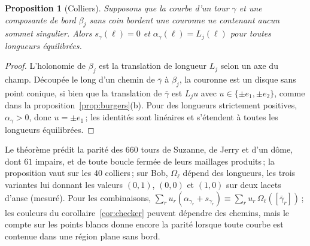 \documentclass[11pt,a4paper]{article}
\newtheorem{proposition}{Proposition}
\newcommand{\shift}{s}
\newcommand{\lean}[1]{\texttt{\detokenize{#1}}}
\newenvironment{evidence}[3][]{}{}
\begin{document}
\begin{evidence}{core}{\lean{collar}\,; supposé~: l'holonomie du tour est conjuguée à celle de la composante de bord, et $\alpha_\gamma > 0$}
\begin{proposition}[Colliers]\label{prop:collar}
Supposons que la courbe d'un tour $\gamma$ et une composante de bord
$\beta_j$ sans coin bordent une couronne ne contenant aucun sommet singulier.
Alors $\shift_\gamma(\ell) = 0$ et $\alpha_\gamma(\ell) = L_j(\ell)$ pour
toutes longueurs équilibrées.
\end{proposition}
\end{evidence}
\begin{proof}
L'holonomie de $\beta_j$ est la translation de longueur $L_j$ selon un axe du
champ. Découpée le long d'un chemin de $\bar\gamma$ à $\beta_j$, la couronne
est un disque sans point conique, si bien que la translation de $\bar\gamma$
est $L_j u$ avec $u \in \{\pm e_1, \pm e_2\}$, comme dans la
proposition~\ref{prop:burgers}(b). Pour des longueurs strictement positives,
$\alpha_\gamma > 0$, donc $u = \pm e_1$\,; les identités sont linéaires et
s'étendent à toutes les longueurs équilibrées.
\end{proof}

Le théorème prédit la parité des $660$ tours de Suzanne, de Jerry et d'un
dôme, dont $61$ impairs, et de toute boucle fermée de leurs maillages
produits\,; la proposition vaut sur les $40$ colliers\,;
sur Bob, $\Omega_\ell$ dépend des longueurs, les trois variantes lui donnant
les valeurs $(0, 1)$, $(0, 0)$ et $(1, 0)$ sur deux lacets d'anse (mesuré).
Pour les combinaisons, $\sum_r u_r(\alpha_{\gamma_r} + \shift_{\gamma_r})
\equiv \sum_r u_r\, \Omega_\ell([\bar\gamma_r])$\,; les couleurs du
corollaire~\ref{cor:checker} peuvent dépendre des chemins, mais le compte sur
les points blancs donne encore la parité lorsque toute courbe est contenue
dans une région plane sans bord.
\end{document}
